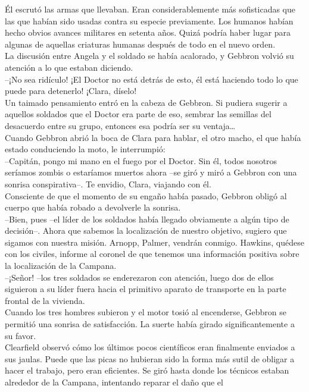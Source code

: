 Él escrutó las armas que llevaban. Eran considerablemente más
sofisticadas que las que habían sido usadas contra su especie
previamente. Los humanos habían hecho obvios avances militares en
setenta años. Quizá podría haber lugar para algunas de aquellas
criaturas humanas después de todo en el nuevo orden.\\
La discusión entre Angela y el soldado se había acalorado, y Gebbron
volvió su atención a lo que estaban diciendo.\\
--¡No sea ridículo! ¡El Doctor no está detrás de esto, él está haciendo
todo lo que puede para detenerlo! ¡Clara, díselo!\\
Un taimado pensamiento entró en la cabeza de Gebbron. Si pudiera sugerir
a aquellos soldados que el Doctor era parte de eso, sembrar las semillas
del desacuerdo entre su grupo, entonces esa podría ser su
ventaja\ldots{}\\
Cuando Gebbron abrió la boca de Clara para hablar, el otro macho, el que
había estado conduciendo la moto, le interrumpió:\\
--Capitán, pongo mi mano en el fuego por el Doctor. Sin él, todos
nosotros seríamos zombis o estaríamos muertos ahora --se giró y miró a
Gebbron con una sonrisa conspirativa--. Te envidio, Clara, viajando con
él.\\
Consciente de que el momento de su engaño había pasado, Gebbron obligó
al cuerpo que había robado a devolverle la sonrisa.\\
--Bien, pues --el líder de los soldados había llegado obviamente a algún
tipo de decisión--. Ahora que sabemos la localización de nuestro
objetivo, sugiero que sigamos con nuestra misión. Arnopp, Palmer,
vendrán conmigo. Hawkins, quédese con los civiles, informe al coronel de
que tenemos una información positiva sobre la localización de la
Campana.\\
--¡Señor! --los tres soldados se enderezaron con atención, luego dos de
ellos siguieron a su líder fuera hacia el primitivo aparato de
transporte en la parte frontal de la vivienda.\\
Cuando los tres hombres subieron y el motor tosió al encenderse, Gebbron
se permitió una sonrisa de satisfacción. La suerte había girado
significantemente a su favor.\\[2\baselineskip]Clearfield observó cómo
los últimos pocos científicos eran finalmente enviados a sus jaulas.
Puede que las picas no hubieran sido la forma más sutil de obligar a
hacer el trabajo, pero eran eficientes. Se giró hasta donde los técnicos
estaban alrededor de la Campana, intentando reparar el daño que el
